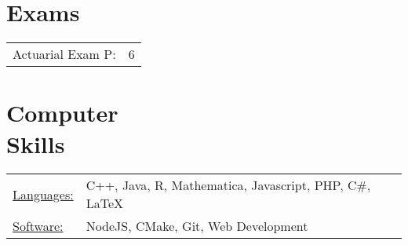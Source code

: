 \documentclass[margin]{res}
\begin{document}
\begin{resume}
\section{Exams}
\begin{tabular}{l p{3in}}
Actuarial Exam P: & 6
\end{tabular}


\section{Computer \\ Skills}
\begin{tabular}{l p{3in}}
\underline{Languages:} & C++, Java, R, Mathematica, 
Javascript, PHP, C\#, \LaTeX \\
\underline{Software:} &  NodeJS, CMake, Git, Web Development
\end{tabular}

\end{resume} 
\end{document}
